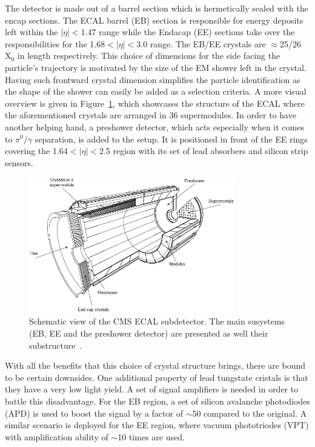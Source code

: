 \hspace{10pt} The detector is made out of a barrel section which is hermetically sealed with the encap sections. The ECAL barrel (EB) section is responsible for energy deposits left within the $|\eta|<$1.47 range while the Endacap (EE) sections take over the responsibilities for the 1.68$<|\eta|<$3.0 range. The EB/EE crystals are $\approx$25/26 X$_\text{0}$ in length respectively. This choice of dimensions for the side facing the particle's trajectory is motivated by the size of the EM shower left in the crystal. Having such frontward crystal dimension simplifies the particle identification as the shape of the shower can easily be added as a selection criteria. A more visual overview is given in Figure~\ref{fig:ecal}, which showcases the structure of the ECAL where the aforementioned crystals are arranged in 36 supermodules. In order to have another helping hand, a preshower detector, which acts especially when it comes to $\pi^\text{0}/\gamma$ separation, is added to the setup. It is positioned in front of the EE rings covering the 1.64$<|\eta|<$2.5 region with its set of lead absorbers and silicon strip sensors.
\begin{figure}[htbp]
  \centering
    \includegraphics[width=0.8\textwidth]{CMS_experiment/CMS_ECAL.png}
  \caption[Schematic view of the CMS ECAL subdetector. The main susystems (EB, EE and the preshower detector) are presented as well their substructure]{Schematic view of the CMS ECAL subdetector. The main susystems (EB, EE and the preshower detector) are presented as well their substructure~\cite{cms:ecal}.}
  \label{fig:ecal}
\end{figure}

\hspace{10pt} With all the benefits that this choice of crystal structure brings, there are bound to be certain downsides. One additional property of lead tungstate cristals is that they have a very low light yield.  A set of signal amplifiers is needed in order to battle this disadvantage. For the EB region, a set of silicon avalanche photodiodes (APD) is used to boost the signal by a factor of $\sim$50 compared to the original. A similar scenario is deployed for the EE region, where vacuum phototriodes (VPT) with amplification ability of $\sim$10 times are used.

